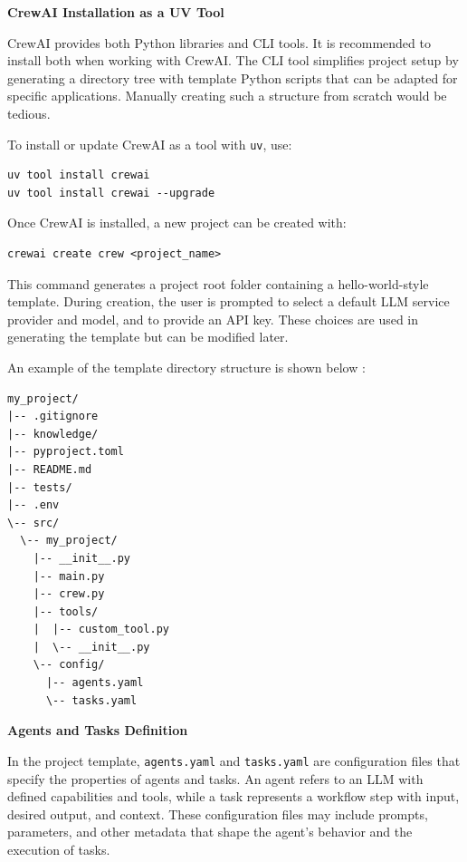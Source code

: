\vspace{0.1in}
\noindent \textbf{CrewAI Installation as a UV Tool}
\vspace{0.1in}

CrewAI provides both Python libraries and CLI tools. It is recommended to install both when working with CrewAI. The CLI tool simplifies project setup by generating a directory tree with template Python scripts that can be adapted for specific applications. Manually creating such a structure from scratch would be tedious.

To install or update CrewAI as a tool with \verb|uv|, use:
\begin{lstlisting}
uv tool install crewai
uv tool install crewai --upgrade
\end{lstlisting}

Once CrewAI is installed, a new project can be created with:
\begin{lstlisting}
crewai create crew <project_name>
\end{lstlisting}

This command generates a project root folder containing a hello-world-style template. During creation, the user is prompted to select a default LLM service provider and model, and to provide an API key. These choices are used in generating the template but can be modified later.

An example of the template directory structure is shown below \cite{crewai2025install}:
\begin{lstlisting}
my_project/
|-- .gitignore
|-- knowledge/
|-- pyproject.toml
|-- README.md
|-- tests/
|-- .env
\-- src/
  \-- my_project/
    |-- __init__.py
    |-- main.py
    |-- crew.py
    |-- tools/
    |  |-- custom_tool.py
    |  \-- __init__.py
    \-- config/
      |-- agents.yaml
      \-- tasks.yaml
\end{lstlisting}

\vspace{0.1in}
\noindent \textbf{Agents and Tasks Definition}
\vspace{0.1in}

In the project template, \verb|agents.yaml| and \verb|tasks.yaml| are configuration files that specify the properties of agents and tasks. An agent refers to an LLM with defined capabilities and tools, while a task represents a workflow step with input, desired output, and context. These configuration files may include prompts, parameters, and other metadata that shape the agent’s behavior and the execution of tasks.

